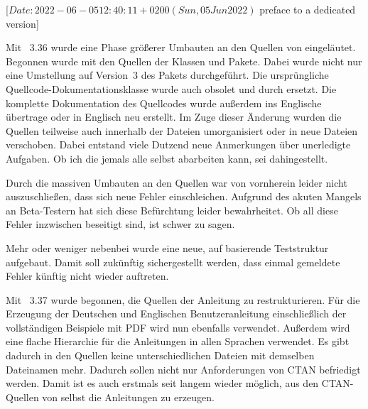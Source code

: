 %
%
%
%
%

                 [$Date: 2022-06-05 12:40:11 +0200 (Sun, 05 Jun 2022) $
                  preface to a dedicated version]


Mit \KOMAScript~3.36 wurde eine Phase größerer Umbauten an den Quellen von
\KOMAScript{} eingeläutet. Begonnen wurde mit den Quellen der Klassen und
Pakete. Dabei wurde nicht nur eine Umstellung auf Version~3 des Pakets
 durchgeführt. Die ursprüngliche Quellcode-Dokumentationsklasse
 wurde auch obsolet und durch 
ersetzt. Die komplette Dokumentation des Quellcodes wurde außerdem ins
Englische übertrage oder in Englisch neu erstellt. Im Zuge dieser Änderung
wurden die Quellen teilweise auch innerhalb der Dateien umorganisiert oder in
neue Dateien verschoben. Dabei entstand viele Dutzend neue Anmerkungen über
unerledigte Aufgaben. Ob ich die jemals alle selbst abarbeiten
kann, sei dahingestellt.

Durch die massiven Umbauten an den Quellen war von vornherein leider nicht
auszuschließen, dass sich neue Fehler einschleichen. Aufgrund des akuten
Mangels an Beta-Testern hat sich diese Befürchtung leider bewahrheitet. Ob all
diese Fehler inzwischen beseitigt sind, ist schwer zu sagen.

Mehr oder weniger nebenbei wurde eine neue, auf  basierende
Teststruktur aufgebaut. Damit soll zukünftig sichergestellt werden, dass
einmal gemeldete Fehler künftig nicht wieder auftreten.

Mit \KOMAScript~3.37 wurde begonnen, die Quellen der Anleitung zu
restrukturieren. Für die Erzeugung der Deutschen und Englischen
Benutzeranleitung einschließlich der vollständigen Beispiele mit PDF wird nun
ebenfalls  verwendet. Außerdem wird eine flache Hierarchie
für die Anleitungen in allen Sprachen verwendet. Es gibt dadurch in den
Quellen keine unterschiedlichen Dateien mit demselben Dateinamen
mehr. Dadurch sollen nicht nur Anforderungen von CTAN befriedigt werden. Damit
ist es auch erstmals seit langem wieder möglich, aus den CTAN-Quellen von
\KOMAScript{} selbst die Anleitungen zu erzeugen.

